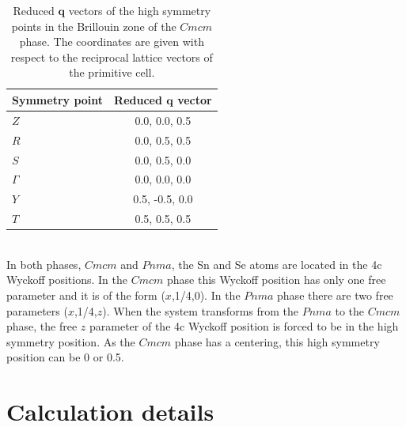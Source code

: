 \begin{table}
\begin{center}
\begin{tabular*}{0.45\textwidth}{l c}
 \hline
 \hline
             Symmetry point  & Reduced $\mathbf{q}$ vector  \\
 \hline
 $Z$                  &  0.0, 0.0, 0.5  \\
 $R$                  &  0.0, 0.5, 0.5  \\
 $S$                  &  0.0, 0.5, 0.0  \\
 $\Gamma$             &  0.0, 0.0, 0.0  \\
 $Y$                  &  0.5, -0.5, 0.0  \\
 $T$                  &  0.5, 0.5, 0.5  \\
 \hline
 \hline
\end{tabular*}
\end{center}
\caption[Reduced $\mathbf{q}$ vectors of the high symmetry points in the Brillouin zone of the $Cmcm$ phase.]{Reduced 
$\mathbf{q}$ vectors of the high symmetry points in the Brillouin zone of the $Cmcm$ phase. The coordinates are given 
with respect to the reciprocal lattice vectors of the primitive cell.}
\label{qpoints}
\end{table}
\\

In both phases, $Cmcm$ and $Pnma$, the Sn and Se atoms are located in the 4c Wyckoff positions. In the $Cmcm$ phase 
this Wyckoff position has only one free parameter and it is of the form ($x$,1/4,0). In the $Pnma$ phase there are 
two free parameters ($x$,1/4,$z$). When the system transforms from the $Pnma$ to the $Cmcm$ phase, the free $z$ 
parameter of the 4c Wyckoff position is forced to be in the high symmetry position. As the $Cmcm$ phase has a 
centering, this high symmetry position can be 0 or 0.5.

\section{Calculation details}

